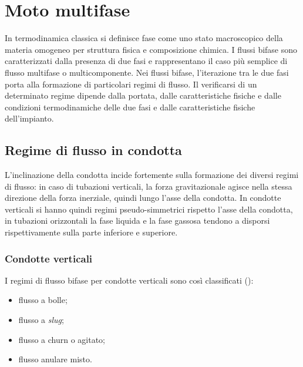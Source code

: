 \section{Moto multifase}
In termodinamica classica si definisce fase come uno stato macroscopico della materia omogeneo per struttura fisica e composizione chimica. I flussi bifase sono caratterizzati dalla presenza di due fasi e rappresentano il caso più semplice di flusso multifase o multicomponente. Nei flussi bifase, l'iterazione tra le due fasi porta alla formazione di particolari regimi di flusso. Il verificarsi di un determinato regime dipende dalla portata, dalle caratteristiche fisiche e dalle condizioni termodinamiche delle due fasi e dalle caratteristiche fisiche dell'impianto.

\subsection{Regime di flusso in condotta}
L'inclinazione della condotta incide fortemente sulla formazione dei diversi regimi di flusso: in caso di tubazioni verticali, la forza gravitazionale agisce nella stessa direzione della forza inerziale, quindi lungo l'asse della condotta. In condotte verticali si hanno quindi regimi pseudo-simmetrici rispetto l'asse della condotta, in tubazioni orizzontali la fase liquida e la fase gassosa tendono a disporsi rispettivamente sulla parte inferiore e superiore. 

\subsubsection{Condotte verticali} \label{sssec:verticali}
I regimi di flusso bifase per condotte verticali sono così classificati ():
\begin{itemize}
    \item flusso a bolle;
    \item flusso a \textit{slug};
    \item flusso a churn o agitato;
    \item flusso anulare misto.
\end{itemize}

